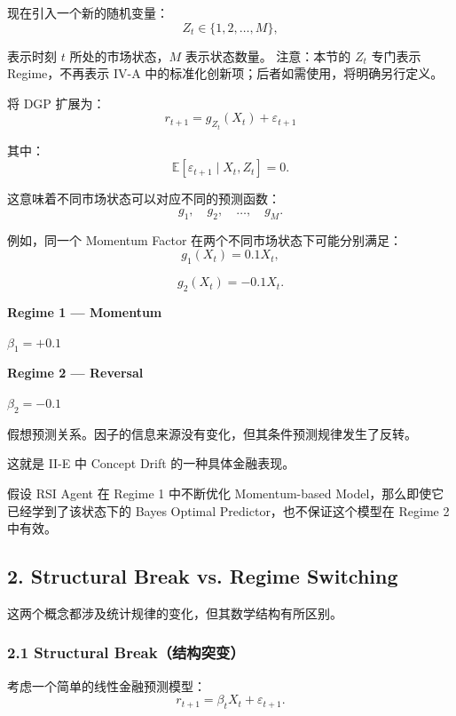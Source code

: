 现在引入一个新的随机变量：
\[Z_t\in\{1,2,\ldots,M\},\]

表示时刻 \(t\) 所处的市场状态，\(M\) 表示状态数量。 注意：本节的 \(Z_t\) 专门表示 Regime，不再表示 IV-A 中的标准化创新项；后者如需使用，将明确另行定义。

将 DGP 扩展为：
\[\boxed{
r_{t+1}
=
g_{Z_t}(X_t)+\varepsilon_{t+1}
}\]

其中：
\[\mathbb E[\varepsilon_{t+1}\mid X_t,Z_t]=0.\]

这意味着不同市场状态可以对应不同的预测函数：
\[g_1,\quad g_2,\quad\ldots,\quad g_M.\]

例如，同一个 Momentum Factor 在两个不同市场状态下可能分别满足：
\[g_1(X_t)=0.1X_t,\]

\[g_2(X_t)=-0.1X_t.\]

\textbf{Regime 1 --- Momentum}


\(\beta_1=+0.1\)

\textbf{Regime 2 --- Reversal}


\(\beta_2=-0.1\)

假想预测关系。因子的信息来源没有变化，但其条件预测规律发生了反转。

这就是 II-E 中 Concept Drift 的一种具体金融表现。

假设 RSI Agent 在 Regime 1 中不断优化 Momentum-based Model，那么即使它已经学到了该状态下的 Bayes Optimal Predictor，也不保证这个模型在 Regime 2 中有效。

\hypertarget{part-4-77-0001-structural-break-vs.-regime-switching}{%
\subsection{2. Structural Break vs. Regime Switching}\label{part-4-77-0001-structural-break-vs.-regime-switching}}

这两个概念都涉及统计规律的变化，但其数学结构有所区别。

\hypertarget{part-4-77-0001-structural-breakux7ed3ux6784ux7a81ux53d8}{%
\subsubsection{2.1 Structural Break（结构突变）}\label{part-4-77-0001-structural-breakux7ed3ux6784ux7a81ux53d8}}

考虑一个简单的线性金融预测模型：
\[r_{t+1}=\beta_tX_t+\varepsilon_{t+1}.\]

